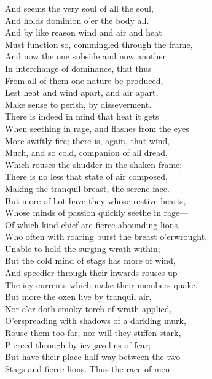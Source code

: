 And seems the very soul of all the soul,\\
And holds dominion o'er the body all.\\
And by like reason wind and air and heat\\
Must function so, commingled through the frame,\\
And now the one subside and now another\\
In interchange of dominance, that thus\\
From all of them one nature be produced,\\
Lest heat and wind apart, and air apart,\\
Make sense to perish, by disseverment.\\
There is indeed in mind that heat it gets\\
When seething in rage, and flashes from the eyes\\
More swiftly fire; there is, again, that wind,\\
Much, and so cold, companion of all dread,\\
Which rouses the shudder in the shaken frame;\\
There is no less that state of air composed,\\
Making the tranquil breast, the serene face.\\
But more of hot have they whose restive hearts,\\
Whose minds of passion quickly seethe in rage—\\
Of which kind chief are fierce abounding lions,\\
Who often with roaring burst the breast o'erwrought,\\
Unable to hold the surging wrath within;\\
But the cold mind of stags has more of wind,\\
And speedier through their inwards rouses up\\
The icy currents which make their members quake.\\
But more the oxen live by tranquil air,\\
Nor e'er doth smoky torch of wrath applied,\\
O'erspreading with shadows of a darkling murk,\\
Rouse them too far; nor will they stiffen stark,\\
Pierced through by icy javelins of fear;\\
But have their place half-way between the two—\\
Stags and fierce lions. Thus the race of men:\\
